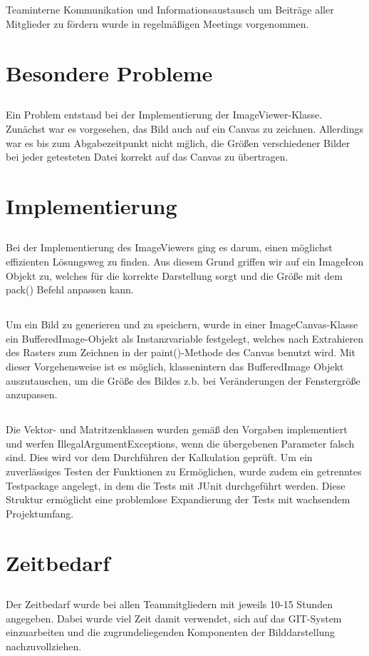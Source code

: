 \documentclass[11pt]{amsart}
\begin{document}
\subsection{}
Teaminterne Kommunikation und Informationsaustausch um Beitr\"age aller Mitglieder zu f\"ordern wurde in regelm\"a\ss{}igen Meetings 
vorgenommen.


\section{Besondere Probleme}
\subsection{}
Ein Problem entstand bei der Implementierung der ImageViewer-Klasse. Zun\"achst war es vorgesehen, das Bild
auch auf ein Canvas zu zeichnen. Allerdings war es bis zum Abgabezeitpunkt nicht m\"glich, die Gr\"o\ss{}en 
verschiedener Bilder bei jeder getesteten Datei korrekt auf das Canvas zu \"ubertragen.


\section{Implementierung}
\subsection{}
Bei der Implementierung des ImageViewers ging es darum, einen m\"oglichst effizienten L\"osungsweg zu finden. Aus diesem Grund
griffen wir auf ein ImageIcon Objekt zu, welches f\"ur die korrekte Darstellung sorgt und die Gr\"o\ss{}e  mit
dem pack() Befehl anpassen kann.

\subsection{}
Um ein Bild zu generieren und zu speichern, wurde in einer ImageCanvas-Klasse ein BufferedImage-Objekt als Instanzvariable
festgelegt, welches nach Extrahieren des Rasters zum Zeichnen in der paint()-Methode des
Canvas benutzt wird.
Mit dieser Vorgehensweise ist es m\"oglich, klassenintern das BufferedImage Objekt auszutauschen, 
um die Gr\"o\ss{}e des Bildes z.b. bei Ver\"anderungen der Fenstergr\"o\ss{}e anzupassen.

\subsection{}
Die Vektor- und Matritzenklassen wurden gem\"a\ss{} den Vorgaben implementiert und werfen IllegalArgumentExceptions, 
wenn die \"ubergebenen Parameter falsch sind. Dies wird vor dem Durchf\"uhren der Kalkulation gepr\"uft.
Um ein zuverl\"assiges Testen der Funktionen zu Erm\"oglichen, wurde zudem ein getrenntes Testpackage angelegt,
in dem die Tests mit JUnit durchgef\"uhrt werden. Diese Struktur erm\"oglicht eine problemlose Expandierung der Tests
mit wachsendem Projektumfang.


\section{Zeitbedarf}
\subsection{}
Der Zeitbedarf wurde bei allen Teammitgliedern mit jeweils 10-15 Stunden angegeben. Dabei 
wurde viel Zeit damit verwendet, sich auf das GIT-System einzuarbeiten und die zugrundeliegenden
Komponenten der Bilddarstellung nachzuvollziehen.
\end{document}

